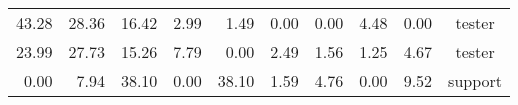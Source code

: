 \begin{table*}[]
\begin{tabular}{@{}rrrrrrrrrc@{}}
      43.28                                                                           & 28.36                                                                                  & 16.42                                                                          & 2.99                                                                                     & 1.49                                                                                     & 0.00                                                                            & 0.00                                                                                     & 4.48                                                                           & 0.00                                                                             & tester                                                        \\
      23.99                                                                           & 27.73                                                                                  & 15.26                                                                          & 7.79                                                                                     & 0.00                                                                                     & 2.49                                                                            & 1.56                                                                                     & 1.25                                                                           & 4.67                                                                             & tester                                                        \\
      0.00                                                                            & 7.94                                                                                   & 38.10                                                                          & 0.00                                                                                     & 38.10                                                                                    & 1.59                                                                            & 4.76                                                                                     & 0.00                                                                           & 9.52                                                                             & support                                                       \\

\end{tabular}
\end{table*}

